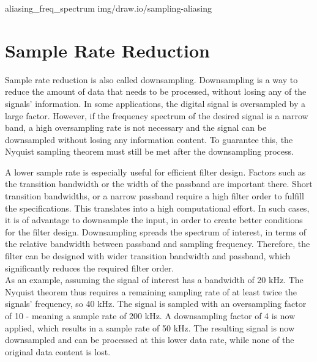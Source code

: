  {aliasing_freq_spectrum} {img/draw.io/sampling-aliasing}

\section{Sample Rate Reduction}

Sample rate reduction is also called downsampling.
Downsampling is a way to reduce the amount of data that needs to be processed, without losing any of the signals' information.
In some applications, the digital signal is oversampled by a large factor.
However, if the frequency spectrum of the desired signal is a narrow band, a high oversampling rate is not necessary and the signal can be downsampled without losing any information content.
To guarantee this, the Nyquist sampling theorem must still be met after the downsampling process.

A lower sample rate is especially useful for efficient filter design.
Factors such as the transition bandwidth or the width of the passband are important there.
Short transition bandwidths, or a narrow passband require a high filter order to fulfill the specifications.
This translates into a high computational effort.
In such cases, it is of advantage to downsample the input, in order to create better conditions for the filter design.
Downsampling spreads the spectrum of interest, in terms of the relative bandwidth between passband and sampling frequency.
Therefore, the filter can be designed with wider transition bandwidth and passband, which significantly reduces the required filter order.\\

As an example, assuming the signal of interest has a bandwidth of 20 kHz.
The Nyquist theorem thus requires a remaining sampling rate of at least twice the signals' frequency, so 40 kHz.
The signal is sampled with an oversampling factor of 10 - meaning a sample rate of 200 kHz.
A downsampling factor of 4 is now applied, which results in a sample rate of 50 kHz.
The resulting signal is now downsampled and can be processed at this lower data rate, while none of the original data content is lost.\\


